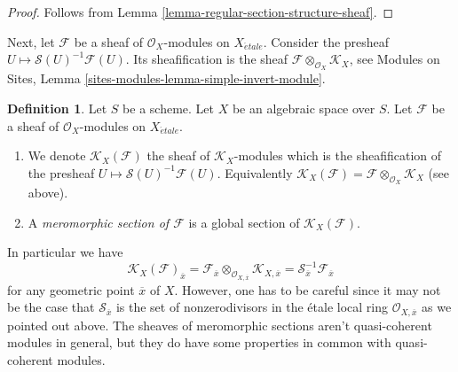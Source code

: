 \documentclass{stacks-project}
\theoremstyle{plain}
\theoremstyle{definition}
\newtheorem{definition}[subsection]{Definition}
\theoremstyle{remark}
\numberwithin{equation}{subsection}
\def\etale{{\acute{e}tale}}
\begin{document}
\begin{proof}
Follows from Lemma \ref{lemma-regular-section-structure-sheaf}.
\end{proof}

\noindent
Next, let $\mathcal{F}$ be a sheaf of $\mathcal{O}_X$-modules
on $X_\etale$.
Consider the presheaf $U \mapsto \mathcal{S}(U)^{-1}\mathcal{F}(U)$.
Its sheafification is the sheaf
$\mathcal{F} \otimes_{\mathcal{O}_X} \mathcal{K}_X$, see
Modules on Sites, Lemma \ref{sites-modules-lemma-simple-invert-module}.

\begin{definition}
\label{definition-meromorphic-section}
Let $S$ be a scheme. Let $X$ be an algebraic space over $S$.
Let $\mathcal{F}$ be a sheaf of $\mathcal{O}_X$-modules
on $X_\etale$.
\begin{enumerate}
\item We denote $\mathcal{K}_X(\mathcal{F})$ the sheaf of
$\mathcal{K}_X$-modules which is the sheafification of the presheaf
$U \mapsto \mathcal{S}(U)^{-1}\mathcal{F}(U)$. Equivalently
$\mathcal{K}_X(\mathcal{F}) =
\mathcal{F} \otimes_{\mathcal{O}_X} \mathcal{K}_X$ (see above).
\item A {\it meromorphic section of $\mathcal{F}$}
is a global section of $\mathcal{K}_X(\mathcal{F})$.
\end{enumerate}
\end{definition}

\noindent
In particular we have
$$
\mathcal{K}_X(\mathcal{F})_{\overline{x}}
=
\mathcal{F}_{\overline{x}}
\otimes_{\mathcal{O}_{X, \overline{x}}} \mathcal{K}_{X, \overline{x}}
=
\mathcal{S}_{\overline{x}}^{-1}\mathcal{F}_{\overline{x}}
$$
for any geometric point $\overline{x}$ of $X$. However, one has to be careful
since it may not be the case that $\mathcal{S}_{\overline{x}}$ is the set of
nonzerodivisors in the \'etale local ring $\mathcal{O}_{X, \overline{x}}$
as we pointed out above. The sheaves of meromorphic sections aren't
quasi-coherent modules in general, but they do have some properties in common
with quasi-coherent modules.
\end{document}
